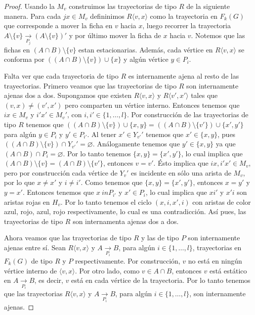 \begin{proof}
    Usando la $M_v$ construimos las trayectorias de tipo $R$ de la siguiente
    manera. Para cada $jx \in M_v$ defininimos $R\langle v, x \rangle$ como la
    trayectoria en $F_k(G)$ que corresponde a mover la ficha en $v$ hacia $x$,
    luego recorrer la trayectoria $A\setminus \{v\} \xrightarrow[P_j]{}
    (A\setminus \{v\})'$ y por \'ultimo mover la ficha de $x$ hacia $v$. Notemos
    que las fichas en $(A\cap B)\setminus \{v\}$ estan estacionarias. Adem\'as,
    cada v\'ertice en $R\langle v,x \rangle$ se conforma por $((A\cap
    B)\setminus \{v\}) \cup \{x\}$ y alg\'un v\'ertice $y \in P_i$.


    Falta ver que cada trayectoria de tipo $R$ es internamente ajena al resto de
    las trayectorias. Primero veamos que las trayectorias de tipo $R$ son
    internamente ajenas dos a dos. Supongamos que existen $R \langle v, x
    \rangle$ y $R\langle v',x' \rangle$ tales que $(v,x) \neq (v',x')$ pero
    comparten un v\'ertice interno. Entonces tenemos que $ix \in M_v$ y $i'x'\in
    M_v'$, con $i, i' \in \{1, \dots, l\}$. Por construcci\'on de las
    trayectorias de tipo $R$ tenemos que $((A\cap B)\setminus \{v\}) \cup \{x,
    y\} =((A\cap B)\setminus \{v'\}) \cup \{x', y'\}$ para alg\'un $y \in P_i$ y
    $y' \in P_{i'}$. Al tener $x'\in Y_{v'} '$ tenemos que $x'\in \{x,y\}$, pues
    $((A \cap B )\setminus \{v\}) \cap Y_{v'}'= \varnothing$. An\'alogamente
    tenemos que $y'\in \{x, y\}$ ya que $(A \cap B) \cap P_i = \varnothing$. Por
    lo tanto tenemos $\{x,y\}= \{x',y'\}$, lo cual implica que $(A\cap
    B)\setminus \{v\} = (A\cap B)\setminus \{v'\}$, entonces $v = v'$. \'Esto
    implica que $ix, i'x' \in M_v$, pero por construcci\'on cada v\'ertice de
    $Y_v '$ es incidente en s\'olo una arista de $M_v$, por lo que $x \neq x'$ y
    $i \neq i'$. Como tenemos que $\{x, y\}=\{x', y'\}$, entonces $x=y'$ y
    $y=x'$. Entonces tenemos que $x \ in P_{i'}$ y $x'\in P_i$, lo cual implica
    que $xi'$ y $x'i$ son aristas rojas en $H_v$. Por lo tanto tenemos el ciclo
    $(x, i, x', i)$ con aristas de color azul, rojo, azul, rojo respectivamente,
    lo cual es una contradicci\'on. As\'i pues, las trayectorias de tipo $R$ son
    internamenta ajenas dos a dos.

    Ahora veamos que las trayectorias de tipo $R$ y las de tipo $P$ son
    internamente ajenas entre s\'i{}. Sean $R\langle v,x \rangle$ y $A
    \xrightarrow[P_i]{}  B$, para alg\'un $i \in \{1, \dots, l\}$, trayectorias
    en $F_k(G)$ de tipo $R$ y $P$ respectivamente. Por construcci\'on, $v$ no
    est\'a en ning\'un v\'ertice interno de $\langle v,x \rangle$. Por otro
    lado, como $ v \in A\cap B$, entonces $v$ est\'a est\'atico en $A
    \xrightarrow[P_i]{}  B$, es decir, $v$ est\'a en cada v\'ertice de la
    trayectoria. Por lo tanto tenemos que las trayectorias $R\langle v,x
    \rangle$ y $A \xrightarrow[P_i]{}  B$, para alg\'un $i \in \{1, \dots, l\}$,
    son internamente ajenas.


\end{proof}
